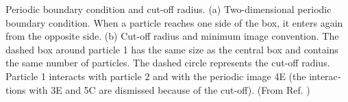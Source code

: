 %
\label{fig:PeriodicBondCond}\foreignlanguage{english}{Periodic boundary
condition and cut-off radius. (a) Two-dimensional periodic boundary
condition. When a particle reaches one side of the box, it enters
again from the opposite side. (b) Cut-off radius and minimum image
convention. The dashed box around particle 1 has the same size as
the central box and contains the same number of particles. The dashed
circle represents the cut-off radius. Particle 1 interacts with particle
2 and with the periodic image 4E (the interactions with 3E and 5C
are dismissed because of the cut-off). (From Ref. \cite{allen:1989})}%
